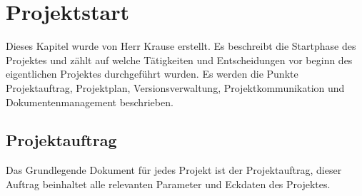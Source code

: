 \chapter{Projektstart}

Dieses Kapitel wurde von Herr Krause erstellt. Es beschreibt die Startphase des Projektes und zählt auf welche Tätigkeiten und Entscheidungen vor beginn des eigentlichen Projektes durchgeführt wurden. Es werden die Punkte Projektauftrag, Projektplan, Versionsverwaltung, Projektkommunikation und Dokumentenmanagement beschrieben.

\section{Projektauftrag}

Das Grundlegende Dokument für jedes Projekt ist der Projektauftrag, dieser Auftrag beinhaltet alle relevanten Parameter und Eckdaten des Projektes.

